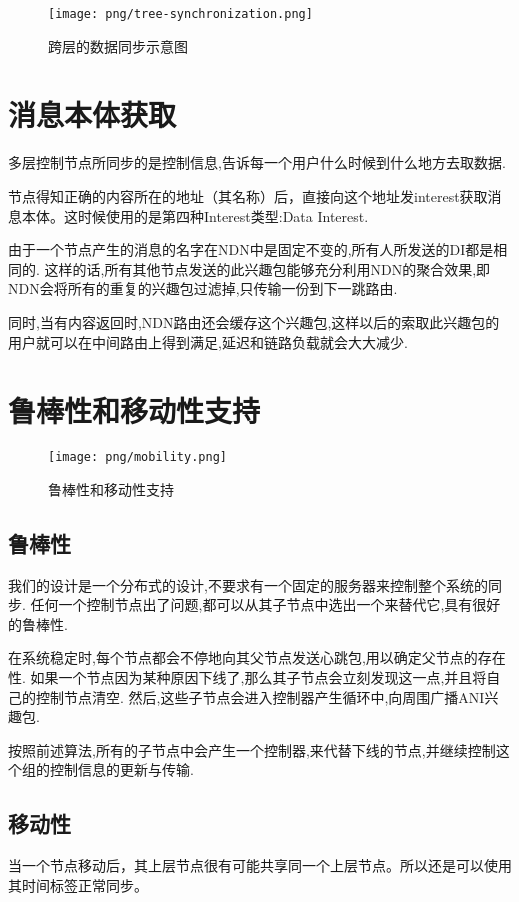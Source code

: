 \begin{figure}
\centering
\texttt{[image: png/tree-synchronization.png]}
\caption{跨层的数据同步示意图}
\label{fig:multi_sync}
\end{figure}

\section{消息本体获取}

多层控制节点所同步的是控制信息,告诉每一个用户什么时候到什么地方去取数据.

节点得知正确的内容所在的地址（其名称）后，直接向这个地址发interest获取消息本体。这时候使用的是第四种Interest类型:Data Interest.

由于一个节点产生的消息的名字在NDN中是固定不变的,所有人所发送的DI都是相同的.
这样的话,所有其他节点发送的此兴趣包能够充分利用NDN的聚合效果,即NDN会将所有的重复的兴趣包过滤掉,只传输一份到下一跳路由.

同时,当有内容返回时,NDN路由还会缓存这个兴趣包,这样以后的索取此兴趣包的用户就可以在中间路由上得到满足,延迟和链路负载就会大大减少.

\section{鲁棒性和移动性支持}

\begin{figure}
\centering
\texttt{[image: png/mobility.png]}
\caption{鲁棒性和移动性支持}
\label{fig:mobility}
\end{figure}

\subsection{鲁棒性}
我们的设计是一个分布式的设计,不要求有一个固定的服务器来控制整个系统的同步.
任何一个控制节点出了问题,都可以从其子节点中选出一个来替代它,具有很好的鲁棒性.

在系统稳定时,每个节点都会不停地向其父节点发送心跳包,用以确定父节点的存在性.
如果一个节点因为某种原因下线了,那么其子节点会立刻发现这一点,并且将自己的控制节点清空.
然后,这些子节点会进入控制器产生循环中,向周围广播ANI兴趣包.

按照前述算法,所有的子节点中会产生一个控制器,来代替下线的节点,并继续控制这个组的控制信息的更新与传输.

\subsection{移动性}
当一个节点移动后，其上层节点很有可能共享同一个上层节点。所以还是可以使用其时间标签正常同步。

